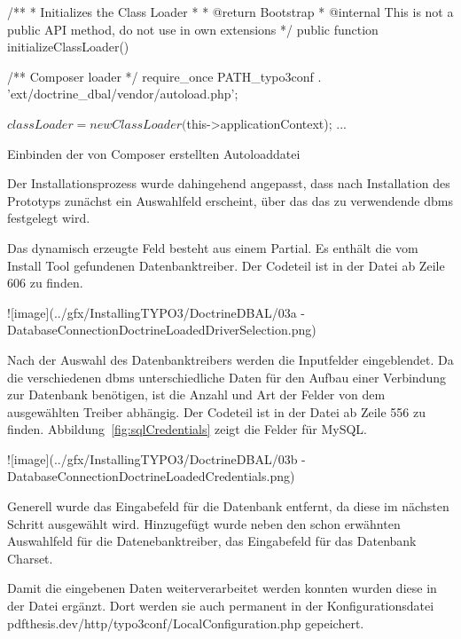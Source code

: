 {\begin{listing}
\begin{phpcode}
	/**
	 * Initializes the Class Loader
	 *
	 * @return Bootstrap
	 * @internal This is not a public API method, do not use in own extensions
	 */
	public function initializeClassLoader() {
		/** Composer loader */
		require_once PATH_typo3conf . 'ext/doctrine_dbal/vendor/autoload.php';

		$classLoader = new ClassLoader($this->applicationContext);
		...
	}
\end{phpcode}
\caption{Einbinden der von Composer erstellten Autoloaddatei}
\label{lst:composerAutoload}
\end{listing}

Der Installationsprozess wurde dahingehend angepasst, dass nach Installation des Prototyps zunächst ein Auswahlfeld erscheint, über das das zu verwendende \gls{dbms} festgelegt wird.

Das dynamisch erzeugte Feld besteht aus einem Partial. Es enthält die vom Install Tool gefundenen Datenbanktreiber. Der Codeteil ist in der Datei  ab Zeile 606 zu finden.

![image](../gfx/InstallingTYPO3/DoctrineDBAL/03a - DatabaseConnectionDoctrineLoadedDriverSelection.png)

Nach der Auswahl des Datenbanktreibers werden die Inputfelder eingeblendet. Da die verschiedenen \gls{dbms} unterschiedliche Daten für den Aufbau einer Verbindung zur Datenbank benötigen, ist die Anzahl und Art der Felder von dem ausgewählten Treiber abhängig. Der Codeteil ist in der Datei  ab Zeile 556 zu finden. Abbildung~\ref{fig:sqlCredentials} zeigt die  Felder für MySQL.

![image](../gfx/InstallingTYPO3/DoctrineDBAL/03b - DatabaseConnectionDoctrineLoadedCredentials.png)

Generell wurde das Eingabefeld für die Datenbank entfernt, da diese im nächsten Schritt ausgewählt wird. Hinzugefügt wurde neben den schon erwähnten Auswahlfeld für die Datenebanktreiber, das Eingabefeld für das Datenbank Charset.

Damit die eingebenen Daten weiterverarbeitet werden konnten wurden diese in der Datei  ergänzt. Dort werden sie auch permanent in der Konfigurationsdatei pdf{thesis.dev/http/typo3conf/LocalConfiguration.php} gepeichert.

}
